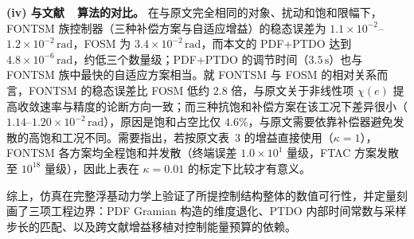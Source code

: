 \textbf{(iv) 与文献~\cite{dou2025fractional}~算法的对比。} 在与原文完全相同的对象、扰动和饱和限幅下，FONTSM 族控制器（三种补偿方案与自适应增益）的稳态误差为 \(1.1\times10^{-2}\)--\(1.2\times10^{-2}\,\mathrm{rad}\)，FOSM 为 \(3.4\times10^{-2}\,\mathrm{rad}\)，而本文的 PDF+PTDO 达到 \(4.8\times10^{-6}\,\mathrm{rad}\)，约低三个数量级；PDF+PTDO 的调节时间（\(3.5\,\mathrm{s}\)）也与 FONTSM 族中最快的自适应方案相当。就 FONTSM 与 FOSM 的相对关系而言，FONTSM 的稳态误差比 FOSM 低约 \(2.8\) 倍，与原文关于非线性项 \(\chi(e)\) 提高收敛速率与精度的论断方向一致；而三种抗饱和补偿方案在该工况下差异很小（\(1.14\)--\(1.20\times10^{-2}\,\mathrm{rad}\)），原因是饱和占空比仅 \(4.6\%\)，与原文需要依靠补偿器避免发散的高饱和工况不同。需要指出，若按原文表~3 的增益直接使用（\(\kappa=1\)），FONTSM 各方案均全程饱和并发散（终端误差 \(1.0\times10^{1}\) 量级，FTAC 方案发散至 \(10^{18}\) 量级），因此上表在 \(\kappa=0.01\) 的标定下比较才有意义。

综上，仿真在完整浮基动力学上验证了所提控制结构整体的数值可行性，并定量刻画了三项工程边界：PDF Gramian 构造的维度退化、PTDO 内部时间常数与采样步长的匹配、以及跨文献增益移植对控制能量预算的依赖。
